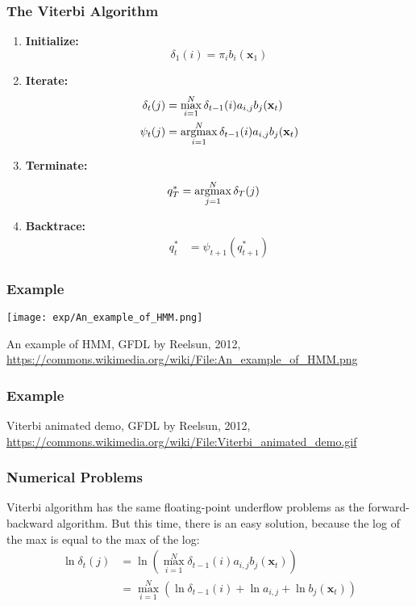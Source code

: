 \documentclass{beamer}
\newcommand{\argmax}{\operatornamewithlimits{argmax}}
\begin{document}
\begin{frame}
  \frametitle{The Viterbi Algorithm}
  \begin{enumerate}
  \item {\bf Initialize:}
    \[
    \delta_1(i) = \pi_i b_i(\mathbf{x}_1)
    \]
  \item {\bf Iterate:}
    \begin{align*}
      \delta_{t}(j) &= \max_{i=1}^N \delta_{t-1}(i) a_{i,j}b_j(\mathbf{x}_t)\\
      \psi_{t}(j) &= \argmax_{i=1}^N \delta_{t-1}(i) a_{i,j}b_j(\mathbf{x}_t)
    \end{align*}
  \item {\bf Terminate:}
    \begin{align*}
      q_T^* &= \argmax_{j=1}^N \delta_T(j)
    \end{align*}
  \item {\bf Backtrace:}
    \begin{align*}
      q_t^* &= \psi_{t+1}\left(q_{t+1}^*\right)
    \end{align*}
  \end{enumerate}
\end{frame}

\begin{frame}
  \frametitle{Example}
  \centerline{\texttt{[image: exp/An\_example\_of\_HMM.png]}}
  \begin{tiny}
    An example of HMM, GFDL by Reelsun, 2012,
    \url{https://commons.wikimedia.org/wiki/File:An_example_of_HMM.png}
  \end{tiny}
\end{frame}

\begin{frame}
  \frametitle{Example}
  \centerline{}
  \begin{tiny}
    Viterbi animated demo, GFDL by Reelsun, 2012,
    \url{https://commons.wikimedia.org/wiki/File:Viterbi_animated_demo.gif}
  \end{tiny}
\end{frame}

\begin{frame}
  \frametitle{Numerical Problems}

  Viterbi algorithm has the same floating-point underflow problems as
  the forward-backward algorithm.  But this time, there is an easy solution,
  because the log of the max is equal to the max of the log:
  \begin{align*}
    \ln\delta_{t}(j) &= \ln\left(\max_{i=1}^N \delta_{t-1}(i) a_{i,j}b_j(\mathbf{x}_t)\right)\\
    &= \max_{i=1}^N\left(\ln\delta_{t-1}(i)+ \ln a_{i,j}+ \ln b_j(\mathbf{x}_t)\right)
  \end{align*}
\end{frame}
      
\end{document}

